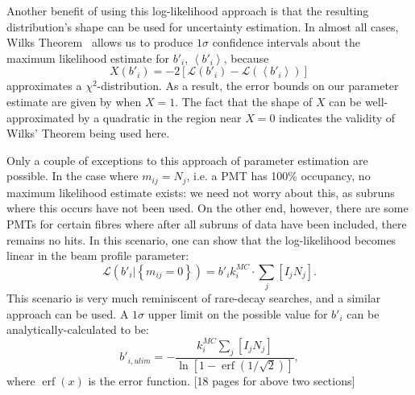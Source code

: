 Another benefit of using this log-likelihood approach is that the resulting distribution's shape can be used for uncertainty estimation. In almost all cases, Wilks Theorem~\cite{wilks_large-sample_1938} allows us to produce $1 \sigma$ confidence intervals about the maximum likelihood estimate for $b'_{i}$, $\left<b'_{i}\right>$, because $$X(b'_{i}) = -2\left[\mathcal{L}\left(b'_{i}\right) - \mathcal{L}\left(\left<b'_{i}\right>\right)\right]$$ approximates a $\chi^2$-distribution. As a result, the error bounds on our parameter estimate are given by when $X = 1$. The fact that the shape of $X$ can be well-approximated by a quadratic in the region near $X = 0$ indicates the validity of Wilks' Theorem being used here.

Only a couple of exceptions to this approach of parameter estimation are possible. In the case where $m_{ij} = N_{j}$, i.e. a PMT has 100\% occupancy, no maximum likelihood estimate exists: we need not worry about this, as subruns where this occurs have not been used. On the other end, however, there are some PMTs for certain fibres where after all subruns of data have been included, there remains no hits. In this scenario, one can show that the log-likelihood becomes linear in the beam profile parameter:
\begin{equation}
    \mathcal{L}\left(b'_{i}|\left\{m_{ij}=0\right\}\right) = b'_{i}k_{i}^{MC}\cdot\sum_{j}\left[I_{j}N_{j}\right].
\end{equation}
This scenario is very much reminiscent of rare-decay searches, and a similar approach can be used. A $1 \sigma$ upper limit on the possible value for $b'_{i}$ can be analytically-calculated to be:
\begin{equation}
    b'_{i,ulim} = -\frac{k_{i}^{MC}\sum_{j}\left[I_{j}N_{j}\right]}{\ln\left[1 - \operatorname{erf}\left(1/\sqrt{2}\right)\right]},
\end{equation}
where $\operatorname{erf}(x)$ is the error function.
{
    \color{blue}
    [18 pages for above two sections]
}

